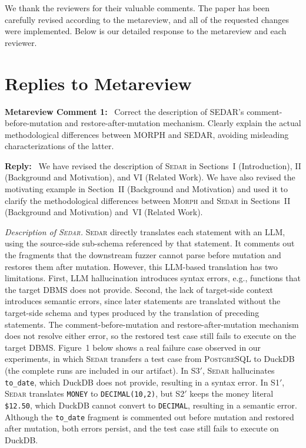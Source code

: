 \documentclass[12pt,letterpaper]{article}
\newcommand{\morph}{\textsc{Morph}}
\newcommand{\sedar}{\textsc{Sedar}}
\newcommand{\tool}{\morph}
\newcommand{\reviewstart}{\par\addvspace{0.85\baselineskip}\Needspace{4\baselineskip}\noindent}
\newcounter{metareviewanchor}
\newcommand{\metareviewcomment}[1]{\reviewstart\renewcommand{\themetareviewanchor}{#1}\refstepcounter{metareviewanchor}\label{metareview:#1}\textbf{Metareview Comment #1:}\ }
\newcommand{\reply}{\par\nobreak\noindent\textbf{Reply:}\ }
\begin{document}
\par
\vspace{0.6\baselineskip}

\noindent We thank the reviewers for their valuable comments.
The paper has been carefully revised according to the metareview, and all of the requested changes were implemented.
Below is our detailed response to the metareview and each reviewer.

\section*{Replies to Metareview}

\metareviewcomment{1} Correct the description of SEDAR's comment-before-mutation and restore-after-mutation mechanism. Clearly explain the actual methodological differences between MORPH and SEDAR, avoiding misleading characterizations of the latter.

\reply
We have revised the description of \sedar{} in Sections~I (Introduction), II (Background and Motivation), and VI (Related Work). We have also revised the motivating example in Section~II (Background and Motivation) and used it to clarify the methodological differences between \tool{} and \sedar{} in Sections~II (Background and Motivation) and~VI (Related Work).

\textit{Description of \sedar{}.} \sedar{} directly translates each statement with an LLM, using the source-side sub-schema referenced by that statement. It comments out the fragments that the downstream fuzzer cannot parse before mutation and restores them after mutation. However, this LLM-based translation has two limitations. First, LLM hallucination introduces syntax errors, e.g., functions that the target DBMS does not provide. Second, the lack of target-side context introduces semantic errors, since later statements are translated without the target-side schema and types produced by the translation of preceding statements. The comment-before-mutation and restore-after-mutation mechanism does not resolve either error, so the restored test case still fails to execute on the target DBMS. Figure~1 below shows a real failure case observed in our experiments, in which \sedar{} transfers a test case from \textsc{PostgreSQL} to DuckDB (the complete runs are included in our artifact). In S3$'$, \sedar{} hallucinates \texttt{to\_date}, which DuckDB does not provide, resulting in a syntax error. In S1$'$, \sedar{} translates \texttt{MONEY} to \texttt{DECIMAL(10,2)}, but S2$'$ keeps the money literal \texttt{\textquotesingle{}\$12.50\textquotesingle{}}, which DuckDB cannot convert to \texttt{DECIMAL}, resulting in a semantic error. Although the \texttt{to\_date} fragment is commented out before mutation and restored after mutation, both errors persist, and the test case still fails to execute on DuckDB.
\end{document}

